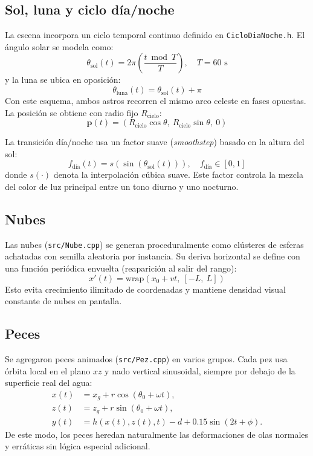 \documentclass[11pt]{article}
\begin{document}
\subsection{Sol, luna y ciclo día/noche}
La escena incorpora un ciclo temporal continuo definido en
\texttt{CicloDiaNoche.h}. El ángulo solar se modela como:
\begin{equation}
\theta_{\text{sol}}(t)=2\pi\left(\frac{t \bmod T}{T}\right),\quad T=60\text{ s}
\end{equation}
y la luna se ubica en oposición:
\begin{equation}
\theta_{\text{luna}}(t)=\theta_{\text{sol}}(t)+\pi
\end{equation}
Con este esquema, ambos astros recorren el mismo arco celeste en fases
opuestas. La posición se obtiene con radio fijo $R_{\text{cielo}}$:
\begin{equation}
\mathbf{p}(t)=\left(R_{\text{cielo}}\cos\theta,\ R_{\text{cielo}}\sin\theta,\ 0\right)
\end{equation}

La transición día/noche usa un factor suave (\emph{smoothstep}) basado en la
altura del sol:
\begin{equation}
f_{\text{día}}(t)=s\!\left(\sin(\theta_{\text{sol}}(t))\right),\quad f_{\text{día}}\in[0,1]
\end{equation}
donde $s(\cdot)$ denota la interpolación cúbica suave. Este factor controla la
mezcla del color de luz principal entre un tono diurno y uno nocturno.

\subsection{Nubes}
Las nubes (\texttt{src/Nube.cpp}) se generan proceduralmente como clústeres
de esferas achatadas con semilla aleatoria por instancia. Su deriva horizontal
se define con una función periódica envuelta (reaparición al salir del rango):
\begin{equation}
x'(t)=\mathrm{wrap}\!\left(x_0+vt,\ [-L,\ L]\right)
\end{equation}
Esto evita crecimiento ilimitado de coordenadas y mantiene densidad visual
constante de nubes en pantalla.

\subsection{Peces}
Se agregaron peces animados (\texttt{src/Pez.cpp}) en varios grupos. Cada pez
usa órbita local en el plano $xz$ y nado vertical sinusoidal, siempre por
debajo de la superficie real del agua:
\begin{align}
x(t) &= x_g + r\cos(\theta_0+\omega t), \\
z(t) &= z_g + r\sin(\theta_0+\omega t), \\
y(t) &= h(x(t),z(t),t) - d + 0.15\sin(2t+\phi).
\end{align}
De este modo, los peces heredan naturalmente las deformaciones de olas
normales y erráticas sin lógica especial adicional.
\end{document}
